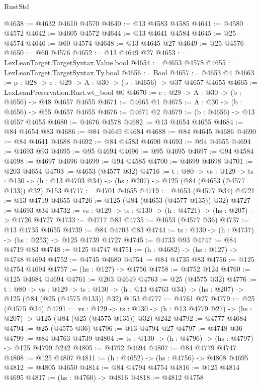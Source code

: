 \begin{lexlean}{RustStd}
\begin{coremodule}
@4638 := @4632 @4610 @4570
@4640 := @13 @4583 @4585
@4641 := @4580 @4572
@4642 := @4605 @4572
@4644 := @13 @4641 @4584
@4645 := @25 @4574
@4646 := @60 @4574
@4648 := @13 @4645 @27
@4649 := @25 @4576
@4650 := @60 @4576
@4652 := @13 @4649 @27
@4653 := LexLeanTarget.TargetSyntax.Value.bool
@4654 := @4653 @4578
@4655 := LexLeanTarget.TargetSyntax.Ty.bool
@4656 := Bool
@4657 := @4653 @4
@4663 := {p : @28} -> {c : @29} -> {A : @30} -> (b : @4656) -> @37 @4657 @4655
@4665 := LexLeanPreservation.Rust.wt_bool @0
@4670 := {c : @29} -> {A : @30} -> (b : @4656) -> @48 @4657 @4655
@4671 := @4665 @1
@4675 := {A : @30} -> (b : @4656) -> @55 @4657 @4655
@4676 := @4671 @2
@4679 := (b : @4656) -> @13 @4657 @4655
@4680 := @4676 @4578
@4682 := @13 @4654 @4655
@4684 := @84 @4654 @83
@4686 := @84 @4649 @4684
@4688 := @84 @4645 @4686
@4690 := @84 @4641 @4688
@4692 := @84 @4583 @4690
@4693 := @94 @4655
@4694 := @4693 @93
@4695 := @95 @4694
@4696 := @95 @4695
@4697 := @94 @4584
@4698 := @4697 @4696
@4699 := @94 @4585
@4700 := @4699 @4698
@4701 := @203 @4654
@4703 := @4653 (@4577 @32)
@4716 := {t : @80} ->
  {vs : @129} ->
  {ts : @130} -> (h : @13 @4703 @34) -> (hs : @207) -> @125 (@84 (@4653 (@4577 @133)) @32) @153
@4717 := @4701 @4655
@4719 := @4653 (@4577 @34)
@4721 := @13 @4719 @4655
@4726 := @125 (@84 (@4653 (@4577 @135)) @32)
@4727 := @4693 @34
@4732 := {vs : @129} -> {ts : @130} -> (h : @4721) -> (hs : @207) -> @4726 @4727
@4733 := @4717 @83
@4735 := @4653 (@4577 @36)
@4737 := @13 @4735 @4655
@4739 := @84 @4703 @83
@4744 := {ts : @130} -> (h : @4737) -> (hs : @253) -> @125 @4739 @4727
@4745 := @4733 @93
@4747 := @84 @4719 @83
@4748 := @125 @4747
@4751 := (h : @4682) -> (hs : @127) -> @4748 @4694
@4752 := @4745 @4680
@4754 := @84 @4735 @83
@4756 := @125 @4754 @4694
@4757 := (hs : @127) -> @4756
@4758 := @4752 @124
@4760 := @125 @4684 @4694
@4761 := @203 @4649
@4763 := @25 (@4575 @32)
@4776 := {t : @80} ->
  {vs : @129} ->
  {ts : @130} -> (h : @13 @4763 @34) -> (hs : @207) -> @125 (@84 (@25 (@4575 @133)) @32) @153
@4777 := @4761 @27
@4779 := @25 (@4575 @34)
@4791 := {vs : @129} ->
  {ts : @130} -> (h : @13 @4779 @27) -> (hs : @207) -> @125 (@84 (@25 (@4575 @135)) @32) @242
@4792 := @4777 @4684
@4794 := @25 (@4575 @36)
@4796 := @13 @4794 @27
@4797 := @4748 @36
@4799 := @84 @4763 @4739
@4804 := {ts : @130} -> (h : @4796) -> (hs : @4797) -> @125 @4799 @242
@4805 := @4792 @4694
@4807 := @84 @4779 @4747
@4808 := @125 @4807
@4811 := (h : @4652) -> (hs : @4756) -> @4808 @4695
@4812 := @4805 @4650
@4814 := @84 @4794 @4754
@4816 := @125 @4814 @4695
@4817 := (hs : @4760) -> @4816
@4818 := @4812 @4758

\end{coremodule}
\end{lexlean}
